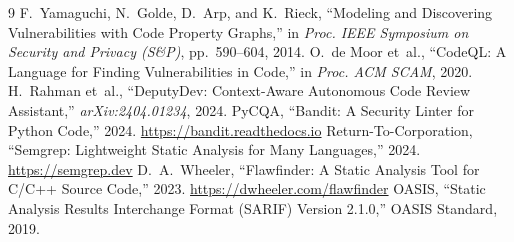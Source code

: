 \documentclass[10pt,conference]{IEEEtran}
\begin{document}
\begin{thebibliography}{9}
 F.~Yamaguchi, N.~Golde, D.~Arp, and K.~Rieck, ``Modeling and Discovering Vulnerabilities with Code Property Graphs,'' in \emph{Proc. IEEE Symposium on Security and Privacy (S\&P)}, pp.~590--604, 2014.
 O.~de Moor et~al., ``CodeQL: A Language for Finding Vulnerabilities in Code,'' in \emph{Proc. ACM SCAM}, 2020.
 H.~Rahman et~al., ``DeputyDev: Context-Aware Autonomous Code Review Assistant,'' \emph{arXiv:2404.01234}, 2024.
 PyCQA, ``Bandit: A Security Linter for Python Code,'' 2024. \url{https://bandit.readthedocs.io}
 Return-To-Corporation, ``Semgrep: Lightweight Static Analysis for Many Languages,'' 2024. \url{https://semgrep.dev}
 D.~A.~Wheeler, ``Flawfinder: A Static Analysis Tool for C/C++ Source Code,'' 2023. \url{https://dwheeler.com/flawfinder}
 OASIS, ``Static Analysis Results Interchange Format (SARIF) Version 2.1.0,'' OASIS Standard, 2019.
\end{thebibliography}
\end{document}
